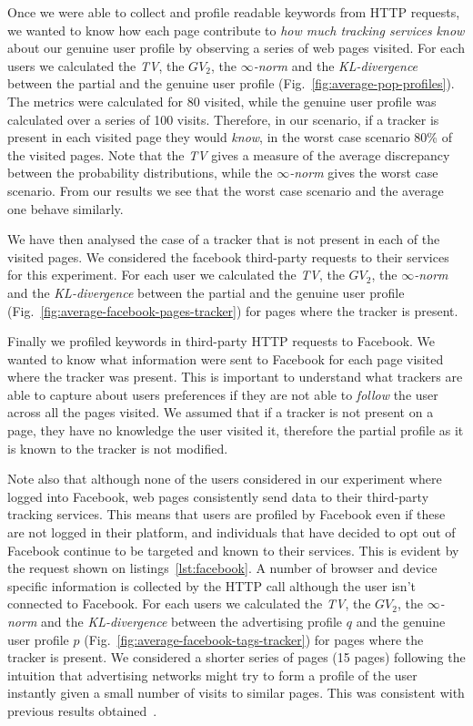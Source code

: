Once we were able to collect and profile readable keywords from HTTP requests, we wanted to know how each page contribute to \emph{how much tracking services know} about our genuine user profile by observing a series of web pages visited.
For each users we calculated the \emph{TV}, the \emph{$GV_2$}, the \emph{$\infty$-norm} and the \emph{KL-divergence} between the partial and the genuine user profile (Fig.~\ref{fig:average-pop-profiles}).
The metrics were calculated for 80 visited, while the genuine user profile was calculated over a series of 100 visits. Therefore, in our scenario, if a tracker is present in each visited page they would \emph{know}, in the worst case scenario 80\% of the visited pages.
Note that the \emph{TV} gives a measure of the average discrepancy between the probability distributions, while the \emph{$\infty$-norm} gives the worst case scenario. From our results we see that the worst case scenario and the average one behave similarly.

We have then analysed the case of a tracker that is not present in each of the visited pages. We considered the facebook third-party requests to their services for this experiment. For each user we calculated the \emph{TV}, the \emph{$GV_2$}, the \emph{$\infty$-norm} and the \emph{KL-divergence} between the partial and the genuine user profile (Fig.~\ref{fig:average-facebook-pages-tracker}) for pages where the tracker is present.

Finally we profiled keywords in third-party HTTP requests to Facebook. We wanted to know what information were sent to Facebook for each page visited where the tracker was present. This is important to understand what trackers are able to capture about users preferences if they are not able to \emph{follow} the user across all the pages visited. We assumed that if a tracker is not present on a page, they have no knowledge the user visited it, therefore the partial profile as it is known to the tracker is not modified.

Note also that although none of the users considered in our experiment where logged into Facebook, web pages consistently send data to their third-party tracking services. This means that users are profiled by Facebook even if these are not logged in their platform, and individuals that have decided to opt out of Facebook continue to be targeted and known to their services. This is evident by the request shown on listings~\ref{lst:facebook}. A number of browser and device specific information is collected by the HTTP call although the user isn't connected to Facebook. For each users we calculated the \emph{TV}, the \emph{$GV_2$}, the \emph{$\infty$-norm} and the \emph{KL-divergence} between the advertising profile $q$ and the genuine user profile $p$ (Fig.~\ref{fig:average-facebook-tags-tracker}) for pages where the tracker is present. We considered a shorter series of pages (15 pages) following the intuition that advertising networks might try to form a profile of the user instantly given a small number of visits to similar pages. This was consistent with previous results obtained~\cite{puglisi2015you}.

